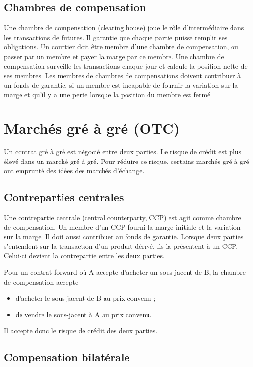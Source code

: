 \subsection{Chambres de compensation}

Une chambre de compensation (clearing house) joue le rôle d'intermédiaire dans les transactions de futures. Il garantie que chaque partie puisse remplir ses obligations. Un courtier doit être membre d'une chambre de compensation, ou passer par un membre et payer la marge par ce membre. Une chambre de compensation surveille les transactions chaque jour et calcule la position nette de ses membres. Les membres de chambres de compensations doivent contribuer à un fonds de garantie, si un membre est incapable de fournir la variation sur la marge et qu'il y a une perte lorsque la position du membre est fermé. 

\section{Marchés gré à gré (OTC)}

Un contrat gré à gré est négocié entre deux parties. Le risque de crédit est plus élevé dans un marché gré à gré. Pour réduire ce risque, certains marchés gré à gré ont emprunté des idées des marchés d'échange. 

\subsection{Contreparties centrales}

Une contrepartie centrale (central counterparty, CCP) est agit comme chambre de compensation. Un membre d'un CCP fourni la marge initiale et la variation sur la marge. Il doit aussi contribuer au fonds de garantie. Lorsque deux parties s'entendent sur la transaction d'un produit dérivé, ils la présentent à un CCP. Celui-ci devient la contrepartie entre les deux parties. 

Pour un contrat forward où A accepte d'acheter un sous-jacent de B, la chambre de compensation accepte 
\begin{itemize}
	\item d'acheter le sous-jacent de B au prix convenu ;
	\item de vendre le sous-jacent à A au prix convenu. 
\end{itemize}
Il accepte donc le risque de crédit des deux parties. 

\subsection{Compensation bilatérale}

